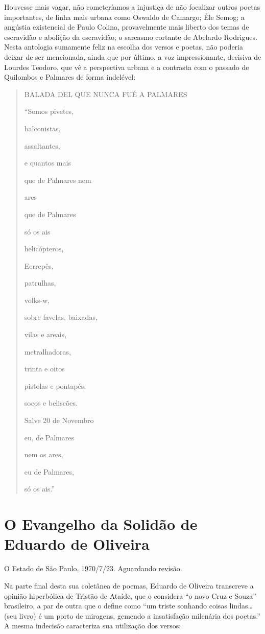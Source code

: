 \documentclass[
  letterpaper,
  DIV=11,
  numbers=noendperiod]{scrreprt}
\begin{document}
Houvesse mais vagar, não cometeríamos a injustiça de não focalizar
outros poetas importantes, de linha mais urbana como Oswaldo de Camargo;
Éle Semog; a angústia existencial de Paulo Colina, provavelmente mais
liberto dos temas de escravidão e abolição da escravidão; o sarcasmo
cortante de Abelardo Rodrigues. Nesta antologia sumamente feliz na
escolha dos versos e poetas, não poderia deixar de ser mencionada, ainda
que por último, a voz impressionante, decisiva de Lourdes Teodoro, que
vê a perspectiva urbana e a contrasta com o passado de Quilombos e
Palmares de forma indelével:

\begin{quote}
BALADA DEL QUE NUNCA FUÉ A PALMARES~

``Somos pivetes,~

balconistas,~

assaltantes,~

e quantos mais~

que de Palmares nem~

ares~

que de Palmares~

só os ais~

helicópteros,~

Eerrepês,~

patrulhas,~

volks-w,~

sobre favelas, baixadas,~

vilas e areais,~

metralhadoras,~

trinta e oitos~

pistolas e pontapés,~

socos e beliscões.~

Salve 20 de Novembro~

eu, de Palmares~

nem os ares,~

eu de Palmares,~

só os ais.''
\end{quote}

\chapter{O Evangelho da Solidão de Eduardo de
Oliveira}\label{o-evangelho-da-soliduxe3o-de-eduardo-de-oliveira}

O Estado de São Paulo, 1970/7/23. Aguardando revisão.

\hfill\break

Na parte final desta sua coletânea de poemas, Eduardo de Oliveira
transcreve a opinião hiperbólica de Tristão de Ataíde, que o considera
``o novo Cruz e Souza'' brasileiro, a par de outra que o define como
``um triste sonhando coisas lindas\ldots{} (seu livro) é um porto de
miragens, gemendo a insatisfação milenária dos poetas.'' A mesma
indecisão caracteriza sua utilização dos versos:
\end{document}
